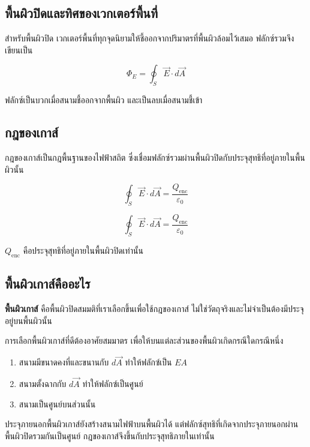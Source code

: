 \subsection{พื้นผิวปิดและทิศของเวกเตอร์พื้นที่}

สำหรับพื้นผิวปิด เวกเตอร์พื้นที่ทุกจุดนิยามให้ชี้ออกจากปริมาตรที่พื้นผิวล้อมไว้เสมอ ฟลักซ์รวมจึงเขียนเป็น

\[
\Phi_E=\oint_S \vec{E}\cdot d\vec{A}
\]

ฟลักซ์เป็นบวกเมื่อสนามชี้ออกจากพื้นผิว และเป็นลบเมื่อสนามชี้เข้า

\subsection{กฎของเกาส์}

กฎของเกาส์เป็นกฎพื้นฐานของไฟฟ้าสถิต ซึ่งเชื่อมฟลักซ์รวมผ่านพื้นผิวปิดกับประจุสุทธิที่อยู่ภายในพื้นผิวนั้น

\[
\oint_S \vec{E}\cdot d\vec{A}
=
\frac{Q_{\text{enc}}}{\varepsilon_0}
\]

\begin{tcolorbox}[title=กฎของเกาส์]
\[
\boxed{
\oint_S \vec{E}\cdot d\vec{A}
=
\frac{Q_{\text{enc}}}{\varepsilon_0}}
\]

$Q_{\text{enc}}$ คือประจุสุทธิที่อยู่ภายในพื้นผิวปิดเท่านั้น
\end{tcolorbox}

\subsection{พื้นผิวเกาส์คืออะไร}

\textbf{พื้นผิวเกาส์} คือพื้นผิวปิดสมมติที่เราเลือกขึ้นเพื่อใช้กฎของเกาส์ ไม่ใช่วัตถุจริงและไม่จำเป็นต้องมีประจุอยู่บนพื้นผิวนั้น

การเลือกพื้นผิวเกาส์ที่ดีต้องอาศัยสมมาตร เพื่อให้บนแต่ละส่วนของพื้นผิวเกิดกรณีใดกรณีหนึ่ง

\begin{enumerate}
    \item สนามมีขนาดคงที่และขนานกับ $d\vec{A}$ ทำให้ฟลักซ์เป็น $EA$
    \item สนามตั้งฉากกับ $d\vec{A}$ ทำให้ฟลักซ์เป็นศูนย์
    \item สนามเป็นศูนย์บนส่วนนั้น
\end{enumerate}

\begin{tcolorbox}[title=ข้อควรระวัง]
ประจุภายนอกพื้นผิวเกาส์ยังสร้างสนามไฟฟ้าบนพื้นผิวได้ แต่ฟลักซ์สุทธิที่เกิดจากประจุภายนอกผ่านพื้นผิวปิดรวมกันเป็นศูนย์ กฎของเกาส์จึงขึ้นกับประจุสุทธิภายในเท่านั้น
\end{tcolorbox}


